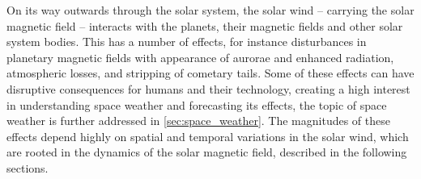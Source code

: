 \begin{figure}[h]
\end{figure}

\pagebreak

On its way outwards through the solar system, the solar wind -- carrying the solar magnetic field -- interacts with the planets, their magnetic fields and other solar system bodies. This has a number of effects, for instance disturbances in planetary magnetic fields with appearance of aurorae and enhanced radiation, atmospheric losses, and stripping of cometary tails. Some of these effects can have disruptive consequences for humans and their technology, creating a high interest in understanding space weather and forecasting its effects, the topic of space weather is further addressed in \autoref{sec:space_weather}. The magnitudes of these effects depend highly on spatial and temporal variations in the solar wind, which are rooted in the dynamics of the solar magnetic field, described in the following sections.

